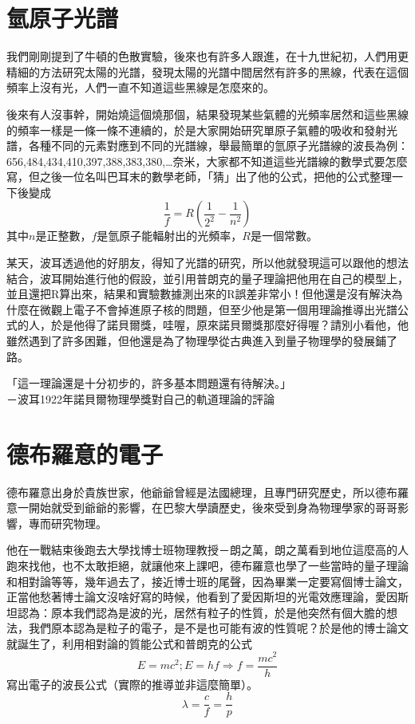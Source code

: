 \section{氫原子光譜}
我們剛剛提到了牛頓的色散實驗，後來也有許多人跟進，在十九世紀初，人們用更精細的方法研究太陽的光譜，發現太陽的光譜中間居然有許多的黑線，代表在這個頻率上沒有光，人們一直不知道這些黑線是怎麼來的。

後來有人沒事幹，開始燒這個燒那個，結果發現某些氣體的光頻率居然和這些黑線的頻率一樣是一條一條不連續的，於是大家開始研究單原子氣體的吸收和發射光譜，各種不同的元素對應到不同的光譜線，舉最簡單的氫原子光譜線的波長為例：656,484,434,410,397,388,383,380,…奈米，大家都不知道這些光譜線的數學式要怎麼寫，但之後一位名叫巴耳末的數學老師，「猜」出了他的公式，把他的公式整理一下後變成
$$\frac{1}{f}=R\left(\frac{1}{2^{2}}-\frac{1}{n^{2}}\right)$$
其中$n$是正整數，$f$是氫原子能輻射出的光頻率，$R$是一個常數。

某天，波耳透過他的好朋友，得知了光譜的研究，所以他就發現這可以跟他的想法結合，波耳開始進行他的假設，並引用普朗克的量子理論把他用在自己的模型上，並且還把R算出來，結果和實驗數據測出來的R誤差非常小！但他還是沒有解決為什麼在微觀上電子不會掉進原子核的問題，但至少他是第一個用理論推導出光譜公式的人，於是他得了諾貝爾獎，哇喔，原來諾貝爾獎那麼好得喔？請別小看他，他雖然遇到了許多困難，但他還是為了物理學從古典進入到量子物理學的發展鋪了路。

\noindent
{\Kai 「這一理論還是十分初步的，許多基本問題還有待解決。」\\－波耳1922年諾貝爾物理學獎對自己的軌道理論的評論}

\section{德布羅意的電子}
德布羅意出身於貴族世家，他爺爺曾經是法國總理，且專門研究歷史，所以德布羅意一開始就受到爺爺的影響，在巴黎大學讀歷史，後來受到身為物理學家的哥哥影響，專而研究物理。

他在一戰結束後跑去大學找博士班物理教授－朗之萬，朗之萬看到地位這麼高的人跑來找他，也不太敢拒絕，就讓他來上課吧，德布羅意也學了一些當時的量子理論和相對論等等，幾年過去了，接近博士班的尾聲，因為畢業一定要寫個博士論文，正當他愁著博士論文沒啥好寫的時候，他看到了愛因斯坦的光電效應理論，愛因斯坦認為：原本我們認為是波的光，居然有粒子的性質，於是他突然有個大膽的想法，我們原本認為是粒子的電子，是不是也可能有波的性質呢？於是他的博士論文就誕生了，利用相對論的質能公式和普朗克的公式
$$
E=m c^{2} ; E=h f \Rightarrow f=\frac{m c^{2}}{h}
$$
寫出電子的波長公式（實際的推導並非這麼簡單）。
$$
\lambda=\frac{c}{f}=\frac{h}{p}
$$

